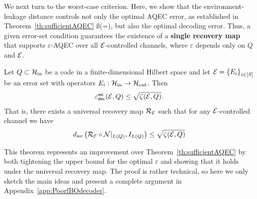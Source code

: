 \documentclass[10pt]{article}
\newcommand{\SIN}{\mathrm{in}}
\newcommand{\SOUT}{\mathrm{out}}
\newcommand{\p}[1]{\left(#1\right)}
\newcommand{\ppp}[1]{\left\{#1\right\}}
\newcommand{\s}[1]{\mathsf{#1}}
\begin{document}
We next turn to the worst-case criterion. Here, we show that the environment-leakage distance controls not only the optimal AQEC error, as established in Theorem~\ref{th:sufficientAQEC} ß{(=\cite[Theorem~3]{Elimelech2026Theory})}, 
but also the optimal decoding error. Thus, a given error-set condition guarantees the existence of a {\bf single recovery map} that supports $\varepsilon$-AQEC over all ${\cal E}$-controlled channels, where $\varepsilon$ depends only on $Q$ and ${\cal E}$.
\begin{theorem}\label{th:DecExistsWorst}
    Let $Q\subset \calH_{\SIN}$ be a code in a finite-dimensional Hilbert space and let $\calE=\ppp{E_i}_{i\in [S]}$ be an error set with operators $E_i:\calH_{\SIN}\to\calH_{\SOUT}$. Then 
    \[\varepsilon_{\s{dec}}^{\s{wc}}(\calE,Q)\leq \sqrt{\zeta(\calE,Q)}.\] 
        That is, there exists a universal recovery map ${\cal R}_{{\cal E}}$ such that for any ${\cal E}$-controlled channel we have 
    \[d_{\mathrm{wc}}\p{\calR_{\calE}\circ \calN|_{L(Q)},I_{L(Q)}}\leq \sqrt{\zeta(\calE,Q)}\]
\end{theorem}
 {This theorem represents an improvement over Theorem~\ref{th:sufficientAQEC} by both tightening the upper bound for the optimal $\varepsilon$ and showing that it holds under the universal recovery map.} The proof is rather technical, so here we only sketch the main ideas and present a complete argument in    Appendix~\ref{app:PoorfBOdecoder}. 
\end{document}
